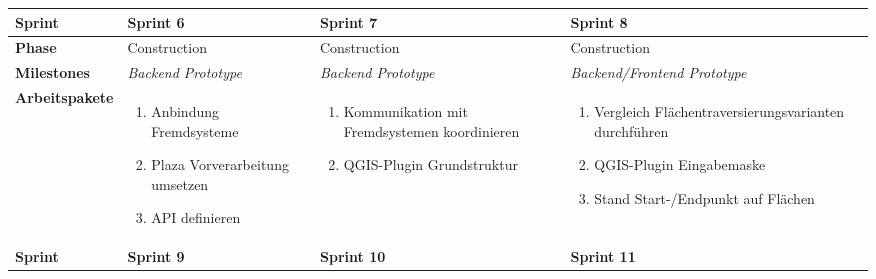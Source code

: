 \begin{landscape}
\begin{longtable}{l p{5.5cm} p{5.5cm} p{5.5cm}}
        
        \toprule
        \textbf{Sprint}
                                & \textbf{Sprint 6}
                                & \textbf{Sprint 7}
                                & \textbf{Sprint 8} \\
        
        \midrule
        \textbf{Phase}
                                & Construction
                                & Construction
                                & Construction \\
        
        \textbf{Milestones}
                                & \textit{Backend Prototype}
                                & \textit{Backend Prototype}
                                & \textit{Backend/Frontend Prototype}  \\
        
        \textbf{Arbeitspakete}
                                & \begin{enumerate}[noitemsep]
                                    \item Anbindung Fremdsysteme
                                    \item Plaza Vorverarbeitung umsetzen
                                    \item API definieren
                                \end{enumerate}
                                & \begin{enumerate}[noitemsep]
                                    \item Kommunikation mit Fremdsystemen koordinieren
                                    \item QGIS-Plugin Grundstruktur
                                \end{enumerate}
                                & \begin{enumerate}[noitemsep]
                                    \item Vergleich Flächentraversierungsvarianten durchführen
                                    \item QGIS-Plugin Eingabemaske
                                    \item Stand Start-/Endpunkt auf Flächen
                                \end{enumerate} \\
        
        
        \pagebreak
        \toprule
        \textbf{Sprint}
                                & \textbf{Sprint 9}
                                & \textbf{Sprint 10}
                                & \textbf{Sprint 11} \\
        

\end{longtable}
\end{landscape}
